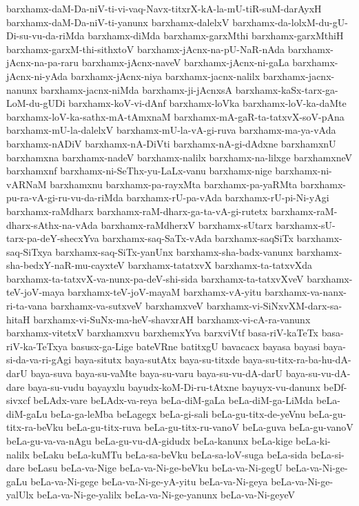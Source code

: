 {barxhamx-daM-Da-niV-ti-vi-vaq-Navx-titxrX-kA-la-mU-tiR-suM-darAyxH
barxhamx-daM-Da-niV-ti-yanunx
barxhamx-dalelxV
barxhamx-da-lolxM-du-gU-Di-su-vu-da-riMda
barxhamx-diMda
barxhamx-garxMthi
barxhamx-garxMthiH
barxhamx-garxM-thi-sithxtoV
barxhamx-jAcnx-na-pU-NaR-nAda
barxhamx-jAcnx-na-pa-raru
barxhamx-jAcnx-naveV
barxhamx-jAcnx-ni-gaLa
barxhamx-jAcnx-ni-yAda
barxhamx-jAcnx-niya
barxhamx-jacnx-nalilx
barxhamx-jacnx-nanunx
barxhamx-jacnx-niMda
barxhamx-ji-jAcnxsA
barxhamx-kaSx-tarx-ga-LoM-du-gUDi
barxhamx-koV-vi-dAnf
barxhamx-loVka
barxhamx-loV-ka-daMte
barxhamx-loV-ka-sathx-mA-tAmxnaM
barxhamx-mA-gaR-ta-tatxvX-soV-pAna
barxhamx-mU-la-dalelxV
barxhamx-mU-la-vA-gi-ruva
barxhamx-ma-ya-vAda
barxhamx-nADiV
barxhamx-nA-DiVti
barxhamx-nA-gi-dAdxne
barxhamxnU
barxhamxna
barxhamx-nadeV
barxhamx-nalilx
barxhamx-na-lilxge
barxhamxneV
barxhamxnf
barxhamx-ni-SeThx-yu-LaLx-vanu
barxhamx-nige
barxhamx-ni-vARNaM
barxhamxnu
barxhamx-pa-rayxMta
barxhamx-pa-yaRMta
barxhamx-pu-ra-vA-gi-ru-vu-da-riMda
barxhamx-rU-pa-vAda
barxhamx-rU-pi-Ni-yAgi
barxhamx-raMdharx
barxhamx-raM-dharx-ga-ta-vA-gi-rutetx
barxhamx-raM-dharx-sAthx-na-vAda
barxhamx-raMdherxV
barxhamx-sUtarx
barxhamx-sU-tarx-pa-deY-shecxYva
barxhamx-saq-SaTx-vAda
barxhamx-saqSiTx
barxhamx-saq-SiTxya
barxhamx-saq-SiTx-yanUnx
barxhamx-sha-badx-vanunx
barxhamx-sha-bedxY-naR-mu-cayxteV
barxhamx-tatatxvX
barxhamx-ta-tatxvXda
barxhamx-ta-tatxvX-va-nunx-pa-deV-shi-sida
barxhamx-ta-tatxvXveV
barxhamx-teV-joV-maya
barxhamx-teV-joV-mayaM
barxhamx-vA-yitu
barxhamx-va-nanx-ri-ta-vana
barxhamx-va-sutxveV
barxhamxveV
barxhamx-vi-SiNxvXM-darx-sa-hitaH
barxhamx-vi-SuNx-ma-heV-shavxrAH
barxhamx-vi-cA-ra-vanunx
barxhamx-vitetxV
barxhamxvu
barxhemxYva
barxviVtf
basa-riV-kaTeTx
basa-riV-ka-TeTxya
basusx-ga-Lige
bateVRne
batitxgU
bavacacx
bayasa
bayasi
baya-si-da-va-ri-gAgi
baya-situtx
baya-sutAtx
baya-su-titxde
baya-su-titx-ra-ba-hu-dA-darU
baya-suva
baya-su-vaMte
baya-su-varu
baya-su-vu-dA-darU
baya-su-vu-dA-dare
baya-su-vudu
bayayxlu
bayudx-koM-Di-ru-tAtxne
bayuyx-vu-danunx
beDf-sivxcf
beLAdx-vare
beLAdx-va-reya
beLa-diM-gaLa
beLa-diM-ga-LiMda
beLa-diM-gaLu
beLa-ga-leMba
beLagegx
beLa-gi-sali
beLa-gu-titx-de-yeVnu
beLa-gu-titx-ra-beVku
beLa-gu-titx-ruva
beLa-gu-titx-ru-vanoV
beLa-guva
beLa-gu-vanoV
beLa-gu-va-va-nAgu
beLa-gu-vu-dA-gidudx
beLa-kanunx
beLa-kige
beLa-ki-nalilx
beLaku
beLa-kuMTu
beLa-sa-beVku
beLa-sa-loV-suga
beLa-sida
beLa-si-dare
beLasu
beLa-va-Nige
beLa-va-Ni-ge-beVku
beLa-va-Ni-gegU
beLa-va-Ni-ge-gaLu
beLa-va-Ni-gege
beLa-va-Ni-ge-yA-yitu
beLa-va-Ni-geya
beLa-va-Ni-ge-yalUlx
beLa-va-Ni-ge-yalilx
beLa-va-Ni-ge-yanunx
beLa-va-Ni-geyeV
}
